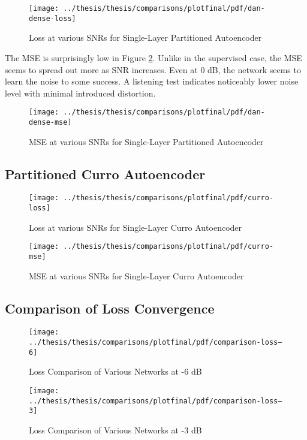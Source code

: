 \begin{figure}[!ht]
\centering
\texttt{[image: ../thesis/thesis/comparisons/plotfinal/pdf/dan-dense-loss]}
\caption{Loss at various SNRs for Single-Layer Partitioned Autoencoder\cite{stow}}
\label{fig:dan-loss}
\end{figure}

The MSE is surprisingly low in Figure \ref{fig:dan-mse}. Unlike in the supervised case, the MSE seems to spread out more as SNR increases. Even at 0 dB, the network seems to learn the noise to some success. A listening test indicates noticeably lower noise level with minimal introduced distortion.

\begin{figure}[!ht]
\centering
\texttt{[image: ../thesis/thesis/comparisons/plotfinal/pdf/dan-dense-mse]}
\caption{MSE at various SNRs for Single-Layer Partitioned Autoencoder\cite{stow}}
\label{fig:dan-mse}
\end{figure}

\subsection{Partitioned Curro Autoencoder}



\begin{figure}[!ht]
\centering
\texttt{[image: ../thesis/thesis/comparisons/plotfinal/pdf/curro-loss]}
\caption{Loss at various SNRs for Single-Layer Curro Autoencoder}
\end{figure}

\begin{figure}[!ht]
\centering
\texttt{[image: ../thesis/thesis/comparisons/plotfinal/pdf/curro-mse]}
\caption{MSE at various SNRs for Single-Layer Curro Autoencoder}
\end{figure}

\subsection{Comparison of Loss Convergence}

\begin{figure}[!ht]
\centering
\texttt{[image: ../thesis/thesis/comparisons/plotfinal/pdf/comparison-loss--6]}
\caption{Loss Comparison of Various Networks at -6 dB}
\end{figure}

\begin{figure}[!ht]
\centering
\texttt{[image: ../thesis/thesis/comparisons/plotfinal/pdf/comparison-loss--3]}
\caption{Loss Comparison of Various Networks at -3 dB}
\end{figure}

